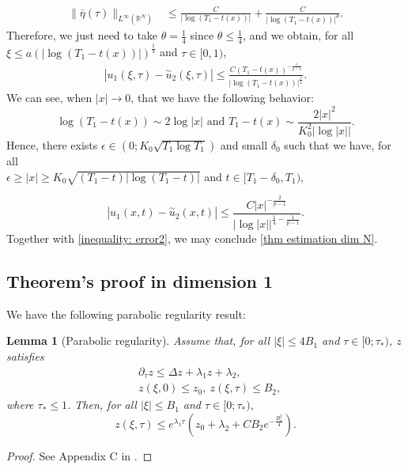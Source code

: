 \documentclass[11pt,a4paper]{article}
\newcommand{\1}{\mathbbm{1}}
\numberwithin{equation}{section}
\newcommand{\numberset}{\mathbb}
\newcommand{\R}{\numberset{R}}
\newtheorem{lemma}{Lemma}[section]
\theoremstyle{remark}
\begin{document}
\begin{equation*}
\begin{split}
\|\bar{\eta}(\tau)\|_{L^\infty(\R^N)}&\leq \frac{C}{|\log(T_1-t(x))|}+\frac{C}{|\log (T_1-t(x))|^{\theta}}.
\end{split}
\end{equation*}
Therefore, we just need to take $\theta=\frac{1}{4}$ since $\theta\leq \frac{1}{4}$, and we obtain, for all $\xi \leq a (|\log(T_1-t(x))|)^{\frac{1}{4}}$ and $\tau \in [0,1)$,
\begin{equation*}
\begin{split}
|u_1(\xi,\tau)-\overset{\sim}{u}_2(\xi,\tau)|\leq \frac{C(T_1-t(x))^{-\frac{1}{p-1}}}{|\log(T_1-t(x))|^{\frac{1}{4}}}.
\end{split}
\end{equation*}
We can see, when $|x|\rightarrow 0$, that we have the following behavior:
\begin{equation}\label{equiv t(x)}
\log(T_1-t(x))\sim 2\log |x|\text{ and } T_1-t(x)\sim \frac{2|x|^2}{K_0^2|\log|x||}.
\end{equation}
Hence, there exists $\epsilon\in  (0; K_0 \sqrt{T_1 \log T_1})$ and small $\delta_0$ such that we have, for all\\ $\epsilon\geq |x|\geq K_0 \sqrt{(T_1-t )|\log (T_1-t)|}$ and $t\in [T_1-\delta_0,T_1)$,

$$|u_1(x,t)-\overset{\sim}{u}_2(x,t)| \leq \frac{C|x|^{-\frac{2}{p-1}}}{|\log|x||^{\frac{1}{4}-\frac{1}{p-1}}}.$$
Together with \eqref{inequality: error2}, we may conclude \eqref{thm estimation dim N}.

\subsection{Theorem's proof in dimension 1}
We have the following parabolic regularity result:
\begin{lemma}[Parabolic regularity]\label{bound z}
Assume that, for all $ |\xi|\leq 4B_1$ and $\tau\in  [0;\tau_*)$, $z$ satisfies
\begin{equation}\label{eq z}
\begin{split}
&\partial_\tau z\leq \Delta z+\lambda_1 z+\lambda_2,\\
&z(\xi,0)\leq z_0,\ z(\xi,\tau)\leq B_2,
\end{split}
\end{equation}
where $\tau_*\leq 1$. Then, for all $|\xi|\leq B_1$ and $\tau\in  [0;\tau_*),$
$$z(\xi, \tau)\leq e^{\lambda_1\tau}(z_0+\lambda_2+CB_2e^{-\frac{B_1^2}{4}}).$$
\end{lemma}
\begin{proof}
See Appendix C in \cite{MZ1998}.
\end{proof}
\end{document}
